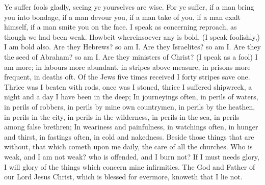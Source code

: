  Ye suffer fools gladly, seeing ye yourselves are wise. For ye suffer, if a man bring you into bondage, if a man devour you, if a man take of you, if a man exalt himself, if a man smite you on the face. I speak as concerning reproach, as though we had been weak. Howbeit whereinsoever any is bold, (I speak foolishly,) I am bold also. Are they Hebrews? so am I. Are they Israelites? so am I. Are they the seed of Abraham? so am I. Are they ministers of Christ? (I speak as a fool) I am more; in labours more abundant, in stripes above measure, in prisons more frequent, in deaths oft. Of the Jews five times received I forty stripes save one. Thrice was I beaten with rods, once was I stoned, thrice I suffered shipwreck, a night and a day I have been in the deep; In journeyings often, in perils of waters, in perils of robbers, in perils by mine own countrymen, in perils by the heathen, in perils in the city, in perils in the wilderness, in perils in the sea, in perils among false brethren; In weariness and painfulness, in watchings often, in hunger and thirst, in fastings often, in cold and nakedness. Beside those things that are without, that which cometh upon me daily, the care of all the churches. Who is weak, and I am not weak? who is offended, and I burn not? If I must needs glory, I will glory of the things which concern mine infirmities. The God and Father of our Lord Jesus Christ, which is blessed for evermore, knoweth that I lie not.

